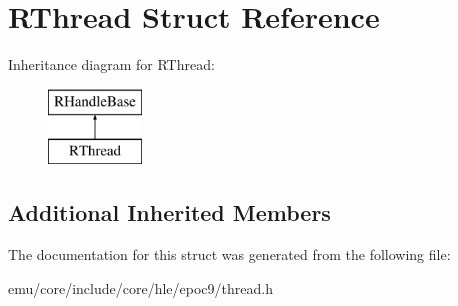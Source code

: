 \hypertarget{struct_r_thread}{}\section{R\+Thread Struct Reference}
\label{struct_r_thread}
Inheritance diagram for R\+Thread\+:\begin{figure}[H]
\begin{center}
\leavevmode
\includegraphics[height=2.000000cm]{struct_r_thread}
\end{center}
\end{figure}
\subsection*{Additional Inherited Members}


The documentation for this struct was generated from the following file\+:\begin{DoxyCompactItemize}
\item 
emu/core/include/core/hle/epoc9/thread.\+h\end{DoxyCompactItemize}

